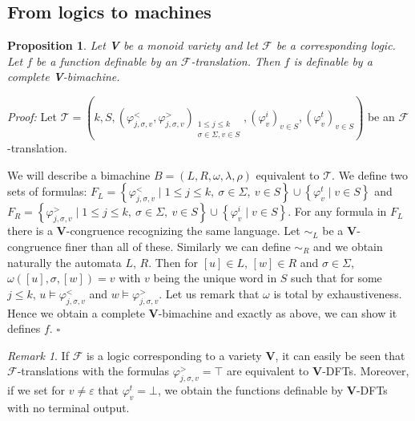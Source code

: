 \documentclass[12pt]{report}
\newtheorem{prp}{Proposition}[section]
\theoremstyle{definition}
\theoremstyle{remark}
\newtheorem{rmk}{Remark}[section]
\newenvironment{prf}
{\textit{Proof:}}
{\hfill $\square$\\}
\begin{document}
\subsection{From logics to machines}

\begin{prp}
\label{t-to-b}
Let \textbf V be a monoid variety and let $\mathcal F$ be a corresponding logic.
Let $f$ be a function definable by an $\mathcal F$-translation. Then $f$ is definable by a complete \textbf V-bimachine.
\end{prp}

\begin{prf}
Let $\mathcal T=\left(k,S,\left(\varphi_{j,\sigma,v}^<,\varphi_{j,\sigma,v}^>\right)_{\begin{smallmatrix} 1\leq j\leq k\\ \sigma \in \Sigma, v\in S \end{smallmatrix}},\left(\varphi_v^i\right)_{v\in S},\left(\varphi_v^t\right)_{v\in S}\right)$ be an $\mathcal F$-translation.

We will describe a bimachine $B=(L,R,\omega,\lambda,\rho)$ equivalent to $\mathcal T$.
We define two sets of formulas: $F_L=\left\{\varphi_{j,\sigma,v}^<\mid 1\leq j\leq k,\ \sigma\in\Sigma,\ v\in S\right\}\cup \left\{\varphi_v^t \mid v\in S\right\}$ and $F_R=\left\{\varphi_{j,\sigma,v}^>\mid 1\leq j\leq k,\ \sigma\in\Sigma,\ v\in S\right\}\cup \left\{\varphi_v^i \mid v\in S\right\}$.
For any formula in $F_L$ there is a \textbf V-congruence recognizing the same language. Let $\sim_L$ be a \textbf V-congruence finer than all of these.
Similarly we can define $\sim_R$ and we obtain naturally the automata $L$, $R$.
Then for $[u]\in L$, $[w]\in R$ and $\sigma\in \Sigma$, $\omega([u],\sigma,[w])=v$ with $v$ being the unique word in $S$ such that for some $j\leq k$, $u\models \varphi_{j,\sigma,v}^<$ and $w\models \varphi_{j,\sigma,v}^>$.
Let us remark that $\omega$ is total by exhaustiveness.
Hence we obtain a complete \textbf V-bimachine and exactly as above, we can show it defines $f$.
\end{prf}

\begin{rmk}
If $\mathcal F$ is a logic corresponding to a variety \textbf V, it can easily be seen that $\mathcal F$-translations with the formulas $\varphi_{j,\sigma,v}^>=\top$ are equivalent to \textbf V-DFTs. Moreover, if we set for $v\neq \varepsilon$ that $\varphi_{v}^t=\bot$, we obtain the functions definable by \textbf V-DFTs with no terminal output.
\end{rmk}
\end{document}
